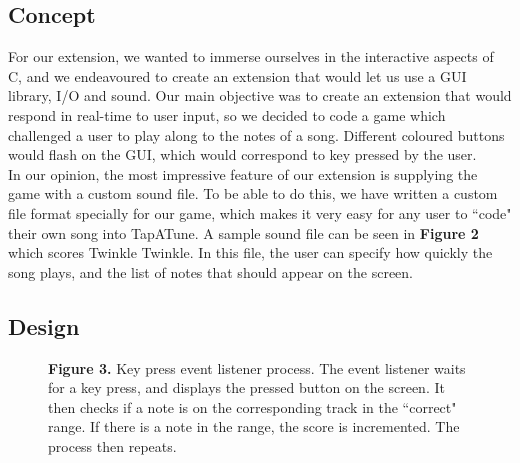 \documentclass[11pt]{article}
\begin{document}
\subsection{Concept}

For our extension, we wanted to immerse ourselves in the interactive aspects of C, and we endeavoured to create an extension that would let us use a GUI library, I/O and sound. Our main objective was to create an extension that would respond in real-time to user input, so we decided to code a game which challenged a user to play along to the notes of a song. Different coloured buttons would flash on the GUI, which would correspond to key pressed by the user.
\\ In our opinion, the most impressive feature of our extension is supplying the game with a custom sound file. To be able to do this, we have written a custom file format specially for our game, which makes it very easy for any user to ``code" their own song into TapATune. A sample sound file can be seen in \textbf{Figure 2} which scores Twinkle Twinkle. In this file, the user can specify how quickly the song plays, and the list of notes that should appear on the screen.

\subsection{Design}

\begin{wrapfigure}{R}{10em}
  \raggedleft
  
  \captionsetup{justification=justified,singlelinecheck=false}
  \caption*{\fontsize{9}{9}\selectfont \textbf{Figure 3.} Key press event listener process. The event listener waits for a key press, and displays the pressed button on the screen. It then checks if a note is on the corresponding track in the ``correct" range. If there is a note in the range, the score is incremented. The process then repeats.}
\end{wrapfigure}
\end{document}
